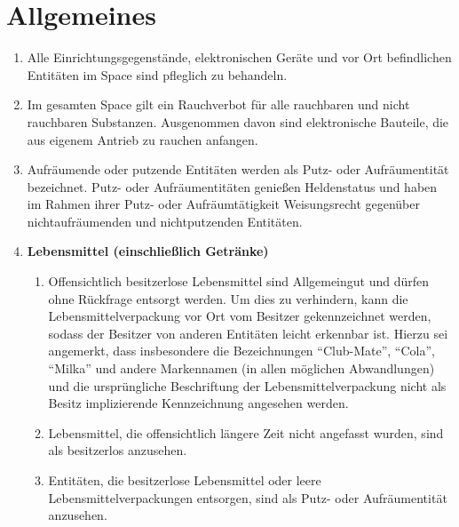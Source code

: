 \documentclass[12pt,a4paper]{scrartcl}
\begin{document}
\section{Allgemeines}
\label{sec:allgemeines}
\begin{enumerate}
  \item Alle Einrichtungsgegenstände, elektronischen Geräte und vor Ort
    befindlichen Entitäten im Space sind pfleglich zu behandeln.

  \item Im gesamten Space gilt ein Rauchverbot für alle rauchbaren und nicht
    rauchbaren Substanzen. Ausgenommen davon sind elektronische Bauteile, die
    aus eigenem Antrieb zu rauchen anfangen.

  \item Aufräumende oder putzende Entitäten werden als Putz- oder Aufräumentität
    bezeichnet. Putz- oder Aufräumentitäten genießen Heldenstatus und haben im
    Rahmen ihrer Putz- oder Aufräumtätigkeit Weisungsrecht gegenüber
    nichtaufräumenden und nichtputzenden Entitäten.

  \item\textbf{Lebensmittel (einschließlich Getränke)}
    \label{item:lebensmittel}\begin{enumerate}
    \item Offensichtlich besitzerlose Lebensmittel sind Allgemeingut und dürfen
      ohne Rückfrage entsorgt werden. Um dies zu verhindern, kann die
      Lebensmittelverpackung vor Ort vom Besitzer gekennzeichnet werden, sodass
      der Besitzer von anderen Entitäten leicht erkennbar ist. Hierzu sei
      angemerkt, dass insbesondere die Bezeichnungen "`Club-Mate"', "`Cola"',
      "`Milka"' und andere Markennamen (in allen möglichen Abwandlungen) und die
      ursprüngliche Beschriftung der Lebensmittelverpackung nicht als Besitz
      implizierende Kennzeichnung angesehen werden.
    \item Lebensmittel, die offensichtlich längere Zeit nicht angefasst wurden,
      sind als besitzerlos anzusehen.
    \item Entitäten, die besitzerlose Lebensmittel oder leere
      Lebensmittelverpackungen entsorgen, sind als Putz- oder Aufräumentität
      anzusehen.
  \end{enumerate}


\end{enumerate}
\end{document}
